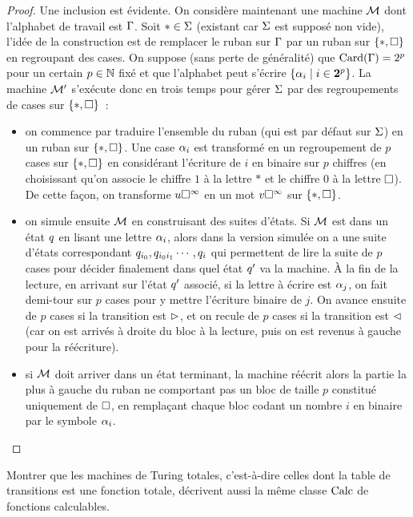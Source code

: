 \begin{proof}
  Une inclusion est évidente. On considère maintenant une machine
  $\mathcal{M}$ dont l'alphabet de travail est $\Gamma$. Soit $*\in\Sigma$
  (existant car $\Sigma$ est supposé non vide), l'idée de la construction est
  de remplacer le ruban sur $\Gamma$ par un ruban sur $\{*,\square\}$ en
  regroupant des cases. On suppose (sans perte de généralité) que
  $\operatorname{Card}(\Gamma) = 2^p$ pour un certain $p\in\mathbb N$ fixé et que l'alphabet peut
  s'écrire $\left\{ \alpha_i \;\middle\vert\; i \in \bm{2}^p \right\}$. La machine $\mathcal{M}'$ s'exécute 
  donc en trois temps pour gérer $\Sigma$ par des regroupements de cases sur
  $\{*,\square\}$~:
  \begin{itemize}
  \item on commence par traduire l'ensemble du ruban (qui est
    par défaut sur $\Sigma$) en un ruban sur $\{*,\square\}$. Une case
    $\alpha_{i}$ est transformé en un regroupement de $p$ cases sur
    $\{*,\square\}$ en considérant l'écriture de $i$ en binaire sur $p$
    chiffres (en choisissant qu'on associe le chiffre $1$ à la lettre
    $*$ et le chiffre $0$ à la lettre $\square$). De cette façon, on
    transforme $u\square^{\infty}$ en un mot $v\square^{\infty}$ sur $\{*,\square\}$.
  \item on simule ensuite $\mathcal{M}$ en construisant des suites
    d'états. Si $\mathcal{M}$ est dans un état $q_{}$ en lisant une lettre
    $\alpha_i$, alors dans la version simulée on a une suite d'états
    correspondant $q_{i_0},q_{i_0i_1}\cdots,q_{i}$ qui
    permettent de lire la suite de $p$ cases pour décider finalement dans
    quel état $q_{}'$ va la machine. \`A la fin de la lecture, en arrivant
    sur l'état $q_{}'$ associé, si la lettre à écrire est $\alpha_j$, on
    fait demi-tour sur $p$ cases pour y mettre l'écriture binaire de $j$.
    On avance ensuite de $p$ cases si la transition est $\rhd$, et on
    recule de $p$ cases si la transition est $\lhd$ (car on est arrivés
    à droite du bloc à la lecture, puis on est revenus à gauche pour la
    réécriture).
  \item si $\mathcal{M}$ doit arriver dans un état terminant, la machine
    réécrit alors la partie la plus à gauche du ruban ne comportant pas
    un bloc de taille $p$ constitué uniquement de $\square$, en remplaçant
    chaque bloc codant un nombre $i$ en binaire par le symbole
    $\alpha_i$.\qedhere
  \end{itemize}
\end{proof}

\begin{exercise}
  Montrer que les machines de Turing totales, c'est-à-dire celles dont la
  table de transitions est une fonction totale, décrivent aussi la même classe
  $\operatorname{Calc}$ de fonctions calculables.
\end{exercise}

